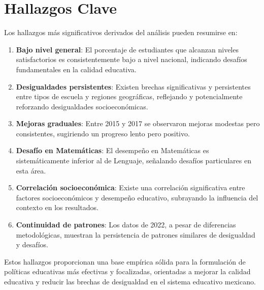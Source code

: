 \section{Hallazgos Clave}

Los hallazgos más significativos derivados del análisis pueden resumirse en:

\begin{enumerate}
    \item \textbf{Bajo nivel general}: El porcentaje de estudiantes que alcanzan niveles satisfactorios es consistentemente bajo a nivel nacional, indicando desafíos fundamentales en la calidad educativa.
    
    \item \textbf{Desigualdades persistentes}: Existen brechas significativas y persistentes entre tipos de escuela y regiones geográficas, reflejando y potencialmente reforzando desigualdades socioeconómicas.
    
    \item \textbf{Mejoras graduales}: Entre 2015 y 2017 se observaron mejoras modestas pero consistentes, sugiriendo un progreso lento pero positivo.
    
    \item \textbf{Desafío en Matemáticas}: El desempeño en Matemáticas es sistemáticamente inferior al de Lenguaje, señalando desafíos particulares en esta área.
    
    \item \textbf{Correlación socioeconómica}: Existe una correlación significativa entre factores socioeconómicos y desempeño educativo, subrayando la influencia del contexto en los resultados.
    
    \item \textbf{Continuidad de patrones}: Los datos de 2022, a pesar de diferencias metodológicas, muestran la persistencia de patrones similares de desigualdad y desafíos.
\end{enumerate}

Estos hallazgos proporcionan una base empírica sólida para la formulación de políticas educativas más efectivas y focalizadas, orientadas a mejorar la calidad educativa y reducir las brechas de desigualdad en el sistema educativo mexicano.
